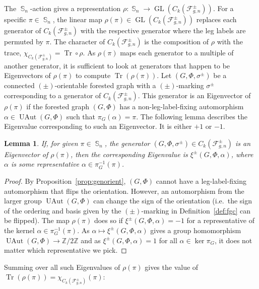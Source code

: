 \documentclass[oneside]{amsart}
\newtheorem{lemma}[theorem]{Lemma}
\theoremstyle{remark}
\newcommand{\Z}{\mathbb{Z}}
\DeclareMathOperator{\Tr}{Tr}
\DeclareMathOperator{\SG}{{\mathbb S}}
\newcommand{\GL}{{\operatorname{GL}}}
\newcommand{\UAut}{{\operatorname{UAut}}}
\newcommand{\F}{\mathcal{F}}
\begin{document}
The $\SG_n$-action gives a representation $\rho: \SG_n \rightarrow \GL(C_k(\F^\pm_{g,n}))$. 
For a specific $\pi \in \SG_n$, the linear map $\rho(\pi)\in \GL(C_k(\F^\pm_{g,n}))$ replaces each generator of $C_k(\F^\pm_{g,n})$ with the respective generator where the leg labels are permuted by $\pi$.
The character of $C_k(\F^\pm_{g,n})$ is the composition of $\rho$ with the trace, $\chi_{C_k(\F^\pm_{g,n})} = \Tr \circ \rho$.
As $\rho(\pi)$ maps each generator to a multiple of another generator,
it is sufficient to look at generators that happen to be Eigenvectors of $\rho(\pi)$ to compute $\Tr(\rho(\pi))$.
Let $(G,\Phi,\sigma^\pm)$ be a connected $(\pm)$-orientable forested graph with a $(\pm)$-marking $\sigma^\pm$ corresponding to a generator of $C_k(\F^\pm_{g,n})$.
This generator is an Eigenvector of $\rho(\pi)$ if the forested graph $(G,\Phi)$ has a non-leg-label-fixing automorphism $\alpha \in \UAut(G,\Phi)$ such that $\pi_G(\alpha) = \pi$. 
The following lemma describes the Eigenvalue corresponding to such an Eigenvector. It is either $+1$ or $-1$.
\begin{lemma}
If, for given $\pi \in \SG_n$, the generator $(G,\Phi,\sigma^\pm) \in C_k(\F^\pm_{g,n})$ is an Eigenvector of $\rho(\pi)$, then
the corresponding Eigenvalue is $\xi^\pm(G,\Phi,\alpha)$,
where $\alpha$ is some representative $\alpha \in \pi_G^{-1}(\pi)$.
\end{lemma}
\begin{proof}
By Proposition~\ref{prop:genorient}, $(G,\Phi)$ cannot have a leg-label-fixing automorphism that flips the orientation. However, an automorphism from the larger group $\UAut(G,\Phi)$ can change the sign of the orientation
(i.e.~the sign of the ordering and basis given by the $(\pm)$-marking in Definition~\ref{def:fgc} can be flipped).
%
%
The map $\rho(\pi)$ does so if $\xi^\pm(G,\Phi,\alpha)=-1$ for a representative of the kernel $\alpha \in \pi_G^{-1}(\pi)$. As $\alpha \mapsto \xi^\pm(G,\Phi,\alpha)$ gives a group homomorphism $\UAut(G,\Phi) \rightarrow \Z/2\Z$ and as $\xi^\pm(G,\Phi,\alpha)=1$ for all $\alpha \in \ker\pi_G$, it does not matter which representative we pick.
\end{proof}

Summing over all such Eigenvalues of $\rho(\pi)$ gives the value of 
$\Tr(\rho(\pi)) = \chi_{C_k(\F^{\pm}_{g,n})}(\pi)$: %
\end{document}
